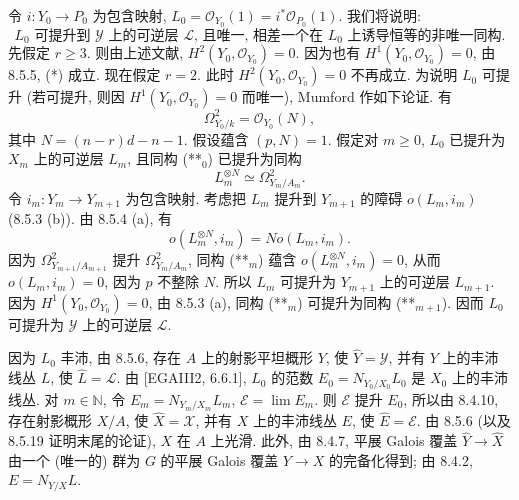 令 $i:Y_0\to P_0$ 为包含映射, $L_0=\mathcal O_{Y_0}(1)=i^*\mathcal O_{P_0}(1)$. 我们将说明:
\begin{equation}\text{$L_0$ 可提升到 $\mathcal Y$ 上的可逆层 $\mathcal L$, 且唯一, 相差一个在 $L_0$ 上诱导恒等的非唯一同构.}\tag{*}\label{ch08:eq864star}\end{equation}
先假定 $r\geq3$. 则由上述文献, $H^2(Y_0,\mathcal O_{Y_0})=0$. 因为也有 $H^1(Y_0,\mathcal O_{Y_0})=0$, 由 8.5.5, (*) 成立. 现在假定 $r=2$. 此时 $H^2(Y_0,\mathcal O_{Y_0})=0$ 不再成立. 为说明 $L_0$ 可提升 (若可提升, 则因 $H^1(Y_0,\mathcal O_{Y_0})=0$ 而唯一), Mumford 作如下论证. 有
\begin{equation}\Omega^2_{Y_0/k}=\mathcal O_{Y_0}(N),\tag{**$_0$}\label{ch08:eq864star20}\end{equation}
其中 $N=(n-r)d-n-1$. 假设蕴含 $(p,N)=1$. 假定对 $m\geq0$, $L_0$ 已提升为 $X_m$ 上的可逆层 $L_m$, 且同构 (**$_0$) 已提升为同构
\begin{equation}L_m^{\otimes N}\simeq\Omega^2_{Y_m/A_m}.\tag{**$_m$}\label{ch08:eq864star2m}\end{equation}
令 $i_m:Y_m\to Y_{m+1}$ 为包含映射. 考虑把 $L_m$ 提升到 $Y_{m+1}$ 的障碍 $o(L_m,i_m)$ (8.5.3 (b)). 由 8.5.4 (a), 有
\[o(L_m^{\otimes N},i_m)=No(L_m,i_m).\]
因为 $\Omega^2_{Y_{m+1}/A_{m+1}}$ 提升 $\Omega^2_{Y_m/A_m}$, 同构 (**$_m$) 蕴含 $o(L_m^{\otimes N},i_m)=0$, 从而 $o(L_m,i_m)=0$, 因为 $p$ 不整除 $N$. 所以 $L_m$ 可提升为 $Y_{m+1}$ 上的可逆层 $L_{m+1}$. 因为 $H^1(Y_0,\mathcal O_{Y_0})=0$, 由 8.5.3 (a), 同构 (**$_m$) 可提升为同构 (**$_{m+1}$). 因而 $L_0$ 可提升为 $\mathcal Y$ 上的可逆层 $\mathcal L$.

因为 $L_0$ 丰沛, 由 8.5.6, 存在 $A$ 上的射影平坦概形 $Y$, 使 $\widehat Y=\mathcal Y$, 并有 $Y$ 上的丰沛线丛 $L$, 使 $\widehat L=\mathcal L$. 由 [EGAIII2, 6.6.1], $L_0$ 的范数 $E_0=N_{Y_0/X_0}L_0$ 是 $X_0$ 上的丰沛线丛. 对 $m\in\mathbb N$, 令 $E_m=N_{Y_m/X_m}L_m$, $\mathcal E=\lim E_m$. 则 $\mathcal E$ 提升 $E_0$, 所以由 8.4.10, 存在射影概形 $X/A$, 使 $\widehat X=\mathcal X$, 并有 $X$ 上的丰沛线丛 $E$, 使 $\widehat E=\mathcal E$. 由 8.5.6 (以及 8.5.19 证明末尾的论证), $X$ 在 $A$ 上光滑. 此外, 由 8.4.7, 平展 Galois 覆盖 $\widehat Y\to\widehat X$ 由一个 (唯一的) 群为 $G$ 的平展 Galois 覆盖 $Y\to X$ 的完备化得到; 由 8.4.2,
$E=N_{Y/X}L$.

